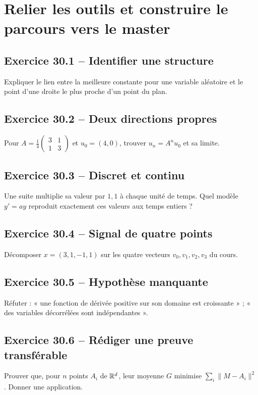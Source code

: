 \chapter{Relier les outils et construire le parcours vers le master}
\section*{Exercice 30.1 -- Identifier une structure}
Expliquer le lien entre la meilleure constante pour une variable aléatoire et le point d'une droite le plus proche d'un point du plan.

\section*{Exercice 30.2 -- Deux directions propres}
Pour $A=\frac14\begin{pmatrix}3&1\\1&3\end{pmatrix}$ et $u_0=(4,0)$, trouver $u_n=A^nu_0$ et sa limite.

\section*{Exercice 30.3 -- Discret et continu}
Une suite multiplie sa valeur par $1{,}1$ à chaque unité de temps. Quel modèle $y'=ay$ reproduit exactement ces valeurs aux temps entiers ?

\section*{Exercice 30.4 -- Signal de quatre points}
Décomposer $x=(3,1,-1,1)$ sur les quatre vecteurs $v_0,v_1,v_2,v_3$ du cours.

\section*{Exercice 30.5 -- Hypothèse manquante}
Réfuter : « une fonction de dérivée positive sur son domaine est croissante » ; « des variables décorrélées sont indépendantes ».

\section*{Exercice 30.6 -- Rédiger une preuve transférable}
Prouver que, pour $n$ points $A_i$ de $\mathbb{R}^d$, leur moyenne $G$ minimise $\sum_i\|M-A_i\|^2$. Donner une application.
